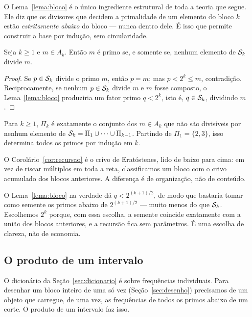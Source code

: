 O Lema~\ref{lema:bloco} é o único ingrediente estrutural de toda a teoria que
segue. Ele diz que os divisores que decidem a primalidade de um elemento do bloco
$k$ estão \emph{estritamente abaixo} do bloco — nunca dentro dele. É isso que
permite construir a base por indução, sem circularidade.

\begin{teorema}\label{teo:crivo}
Seja $k\ge1$ e $m\in A_k$. Então $m$ é primo se, e somente se, nenhum elemento
de $\mathcal{S}_k$ divide $m$.
\end{teorema}

\begin{proof}
Se $p\in\mathcal{S}_k$ divide o primo $m$, então $p=m$; mas $p<2^k\le m$, contradição.
Reciprocamente, se nenhum $p\in\mathcal{S}_k$ divide $m$ e $m$ fosse composto, o
Lema~\ref{lema:bloco} produziria um fator primo $q<2^k$, isto é, $q\in\mathcal{S}_k$,
dividindo $m$.
\end{proof}

\begin{corolario}[recursão]\label{cor:recursao}
Para $k\ge1$, $\Pi_k$ é exatamente o conjunto dos $m\in A_k$ que não são
divisíveis por nenhum elemento de $\mathcal{S}_k=\Pi_1\cup\cdots\cup\Pi_{k-1}$. Partindo
de $\Pi_1=\{2,3\}$, isso determina todos os primos por indução em $k$.
\end{corolario}

O Corolário~\ref{cor:recursao} é o crivo de Eratóstenes, lido de baixo para cima:
em vez de riscar múltiplos em toda a reta, classificamos um bloco com o crivo
acumulado dos blocos anteriores. A diferença é de organização, não de conteúdo.

\begin{observacao}\label{obs:sementemaior}
O Lema~\ref{lema:bloco} na verdade dá $q<2^{(k+1)/2}$, de modo que bastaria tomar
como semente os primos abaixo de $2^{(k+1)/2}$ — muito menos do que $\mathcal{S}_k$.
Escolhemos $2^k$ porque, com essa escolha, a semente coincide exatamente com a
união dos blocos anteriores, e a recursão fica sem parâmetros. É uma escolha de
clareza, não de economia.
\end{observacao}

\subsection{O produto de um intervalo}

O dicionário da Seção~\ref{sec:dicionario} é sobre frequências individuais. Para
desenhar um bloco inteiro de uma só vez (Seção~\ref{sec:desenho}) precisamos de um
objeto que carregue, de uma vez, as frequências de todos os primos abaixo de um
corte. O produto de um intervalo faz isso.

